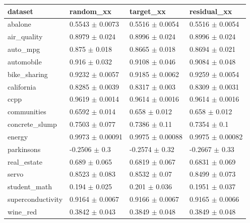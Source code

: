 \begin{tabular}{llll}
\toprule
dataset & random\_xx & target\_xx & residual\_xx \\
\midrule
abalone & 0.5543 $\pm$ 0.0073 & 0.5516 $\pm$ 0.0054 & 0.5516 $\pm$ 0.0054 \\
air\_quality & 0.8979 $\pm$ 0.024 & 0.8996 $\pm$ 0.024 & 0.8996 $\pm$ 0.024 \\
auto\_mpg & 0.875 $\pm$ 0.018 & 0.8665 $\pm$ 0.018 & 0.8694 $\pm$ 0.021 \\
automobile & 0.916 $\pm$ 0.032 & 0.9108 $\pm$ 0.046 & 0.9084 $\pm$ 0.048 \\
bike\_sharing & 0.9232 $\pm$ 0.0057 & 0.9185 $\pm$ 0.0062 & 0.9259 $\pm$ 0.0054 \\
california & 0.8285 $\pm$ 0.0039 & 0.8317 $\pm$ 0.003 & 0.8309 $\pm$ 0.0031 \\
ccpp & 0.9619 $\pm$ 0.0014 & 0.9614 $\pm$ 0.0016 & 0.9614 $\pm$ 0.0016 \\
communities & 0.6592 $\pm$ 0.014 & 0.658 $\pm$ 0.012 & 0.658 $\pm$ 0.012 \\
concrete\_slump & 0.7503 $\pm$ 0.077 & 0.7386 $\pm$ 0.11 & 0.7354 $\pm$ 0.1 \\
energy & 0.9973 $\pm$ 0.00091 & 0.9975 $\pm$ 0.00088 & 0.9975 $\pm$ 0.00082 \\
parkinsons & -0.2506 $\pm$ 0.3 & -0.2574 $\pm$ 0.32 & -0.2667 $\pm$ 0.33 \\
real\_estate & 0.689 $\pm$ 0.065 & 0.6819 $\pm$ 0.067 & 0.6831 $\pm$ 0.069 \\
servo & 0.8523 $\pm$ 0.083 & 0.8532 $\pm$ 0.07 & 0.8499 $\pm$ 0.073 \\
student\_math & 0.194 $\pm$ 0.025 & 0.201 $\pm$ 0.036 & 0.1951 $\pm$ 0.037 \\
superconductivity & 0.9164 $\pm$ 0.0067 & 0.9166 $\pm$ 0.0067 & 0.9165 $\pm$ 0.0066 \\
wine\_red & 0.3842 $\pm$ 0.043 & 0.3849 $\pm$ 0.048 & 0.3849 $\pm$ 0.048 \\
\bottomrule
\end{tabular}
